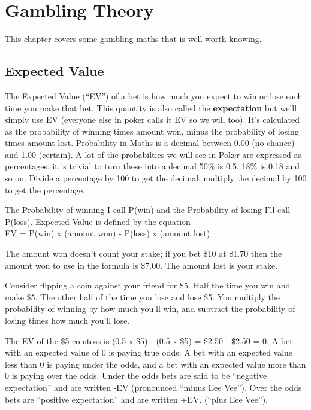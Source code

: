 \chapter{Gambling Theory}



This chapter covers some gambling maths that is well worth knowing.

\section{Expected Value}

The Expected Value (``EV'') of a bet is how much you expect to win or lose
each time you make that bet. This quantity is also called the
\textbf{expectation} but we'll simply use EV (everyone else in poker
calls it EV so we will too). It's calculated as the probability of
winning times amount won, minus the probability of losing times amount
lost. Probability in Maths is a decimal between 0.00 (no chance)
and 1.00 (certain). A lot of the probabilties we will see in Poker
are expressed as percentages, it is trivial to turn these into a decimal
50\% is 0.5, 18\% is 0.18 and so on. Divide a
percentage by 100 to get the decimal, multiply the decimal by 100 to
get the percentage.

The Probability of winning I call P(win) and the Probability of losing
I'll call P(loss). Expected Value is defined by the equation \\
EV = P(win) x (amount won) - P(loss) x (amount lost)

The amount won doesn't count your stake; if you bet \$10 at \$1.70
then the amount won to use in the formula is \$7.00. The amount lost
is your stake.

Consider flipping a coin against your friend
for \$5. Half the time you win and make \$5. The other half of the
time you lose and lose \$5. You multiply the probability of winning
by how much you'll win, and subtract the probability of losing times
how much you'll lose.

The EV of the \$5 cointoss is (0.5 x \$5) - (0.5 x \$5)
= \$2.50 - \$2.50 = 0. A bet with an expected value of 0 is
paying true odds. A bet with an expected value less than 0 is
paying under the odds, and a bet with an expected value more than
0 is paying over the odds. Under the odds bets are said to be
``negative expectation'' and are written -EV (pronounced ``minus Eee Vee'').
Over the odds bets are ``positive expectation'' and are written +EV.
(``plus Eee Vee'').

